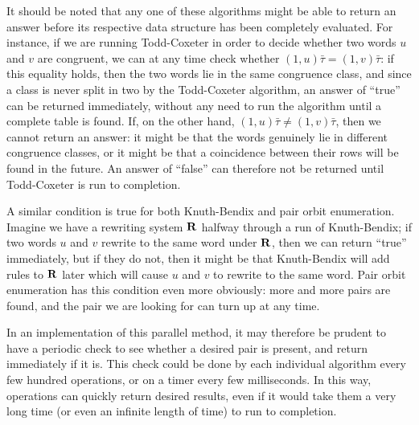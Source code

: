 It should be noted that any one of these algorithms might be able to return an
answer before its respective data structure has been completely evaluated.  For
instance, if we are running Todd-Coxeter in order to decide whether two words
$u$ and $v$ are congruent, we can at any time check whether
$(1,u)\bar\tau = (1,v)\bar\tau$: if this equality holds, then the two words lie
in the same congruence class, and since a class is never split in two by the
Todd-Coxeter algorithm, an answer of ``true'' can be returned immediately,
without any need to run the algorithm until a complete table is found.  If, on
the other hand, $(1,u)\bar\tau \neq (1,v)\bar\tau$, then we cannot return an
answer: it might be that the words genuinely lie in different congruence
classes, or it might be that a coincidence between their rows will be found in
the future.  An answer of ``false'' can therefore not be returned until
Todd-Coxeter is run to completion.

A similar condition is true for both Knuth-Bendix and pair orbit enumeration.
Imagine we have a rewriting system $\mathbf{R}$ halfway through a run of Knuth-Bendix;
if two words $u$ and $v$ rewrite to the same word under $\mathbf{R}$, then we can
return ``true'' immediately, but if they do not, then it might be that
Knuth-Bendix will add rules to $\mathbf{R}$ later which will cause $u$ and $v$ to
rewrite to the same word.  Pair orbit enumeration has this condition even more
obviously: more and more pairs are found, and the pair we are looking for can
turn up at any time.

In an implementation of this parallel method, it may therefore be prudent to
have a periodic check to see whether a desired pair is present, and return
immediately if it is.  This check could be done by each individual algorithm
every few hundred operations, or on a timer every few milliseconds.  In this
way, operations can quickly return desired results, even if it would take them a
very long time (or even an infinite length of time) to run to completion.


